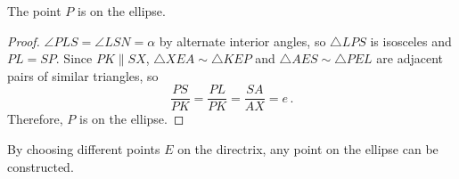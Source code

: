 \begin{theorem}\label{thm.point-on-an-ellipse}
The point $P$ is on the ellipse.
\end{theorem}
\begin{proof}
$\angle PLS = \angle LSN=\alpha$ by alternate interior angles, so $\triangle LPS$ is isosceles and $PL=SP$. Since $PK\parallel SX$, $\triangle XEA\sim \triangle KEP$ and $\triangle AES\sim \triangle PEL$ are adjacent pairs of similar triangles, so
\[
\frac{PS}{PK}=\frac{PL}{PK}=\frac{SA}{AX}=e\,.
\]
Therefore, $P$ is on the ellipse.\hqed
\end{proof}

By choosing different points $E$ on the directrix, any point on the ellipse can be constructed.


%
%
%
%
%
%
%
%

